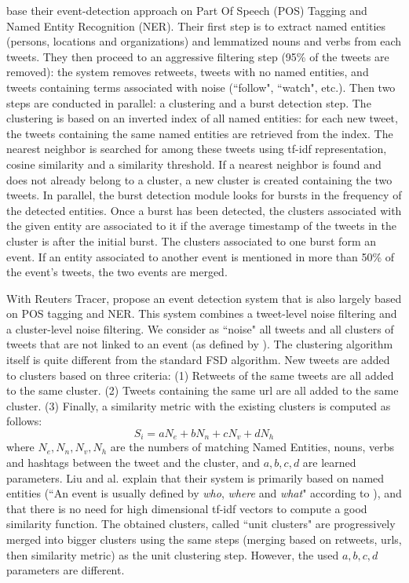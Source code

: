 \citet{mcminn_real_2015} base their event-detection approach on Part Of Speech (POS) Tagging and Named Entity Recognition (NER). Their first step is to extract named entities (persons, locations and organizations) and lemmatized nouns and verbs from each tweets. They then proceed to an aggressive filtering step (95\% of the tweets are removed): the system removes retweets, tweets with no named entities, and tweets containing terms associated with noise (``follow", ``watch", etc.). Then two steps are conducted in parallel: a clustering and a burst detection step. The clustering is based on an inverted index of all named entities: for each new tweet, the tweets containing the same named entities are retrieved from the index. The nearest neighbor is searched for among these tweets using tf-idf representation, cosine similarity and a similarity threshold. If a nearest neighbor is found and does not already belong to a cluster, a new cluster is created containing the two tweets. In parallel, the burst detection module looks for bursts in the frequency of the detected entities. Once a burst has been detected, the clusters associated with the given entity are associated to it if the average timestamp of the tweets in the cluster is after the initial burst. The clusters associated to one burst form an event. If an entity associated to another event is mentioned in more than 50\% of the event's tweets, the two events are merged.

With Reuters Tracer, \citet{liu_reuters_2016} propose an event detection system that is also largely based on POS tagging and NER. This system combines a tweet-level noise filtering and a cluster-level noise filtering. We consider as ``noise" all tweets and all clusters of tweets that are not linked to an event (as defined by \citet{mcminn_building_2013}). The clustering algorithm itself is quite different from the standard FSD algorithm. New tweets are added to clusters based on three criteria: (1) Retweets of the same tweets are all added to the same cluster. (2) Tweets containing the same url are all added to the same cluster. (3) Finally, a similarity metric with the existing clusters is computed as follows:
$$
S_i = aN_e + bN_n + cN_v + dN_h
$$
where $N_e,N_n,N_v,N_h$ are the numbers of matching Named Entities, nouns, verbs and hashtags between the tweet and the cluster, and $a, b, c, d$ are learned parameters. Liu and al. explain that their system is primarily based on named entities (``An event is usually defined by \textit{who}, \textit{where} and \textit{what}" according to \citet{mcminn_building_2013}), and that there is no need for high dimensional tf-idf vectors to compute a good similarity function. The obtained clusters, called ``unit clusters" are progressively merged into bigger clusters using the same steps (merging based on retweets, urls, then similarity metric) as the unit clustering step. However, the used $a, b, c, d$ parameters are different.

